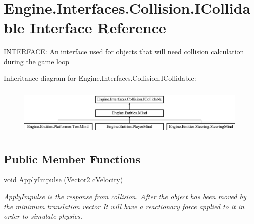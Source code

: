 \hypertarget{a00426}{}\section{Engine.\+Interfaces.\+Collision.\+I\+Collidable Interface Reference}
\label{a00426}


I\+N\+T\+E\+R\+F\+A\+CE\+: An interface used for objects that will need collision calculation during the game loop  


Inheritance diagram for Engine.\+Interfaces.\+Collision.\+I\+Collidable\+:\begin{figure}[H]
\begin{center}
\leavevmode
\includegraphics[height=2.393162cm]{d7/db9/a00426}
\end{center}
\end{figure}
\subsection*{Public Member Functions}
\begin{DoxyCompactItemize}
\item 
void \hyperlink{a00426_a000ca0336b06e3f2d658d442a83dbbbb}{Apply\+Impulse} (Vector2 c\+Velocity)
\begin{DoxyCompactList}\small\item\em Apply\+Impulse is the response from collision. After the object has been moved by the minimum translation vector It will have a reactionary force applied to it in order to simulate physics. \end{DoxyCompactList}\end{DoxyCompactItemize}
